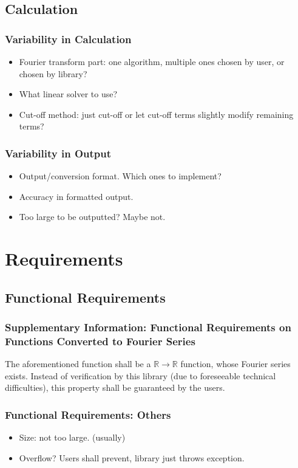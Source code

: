 \documentclass{beamer}
\begin{document}
		\subsection{Calculation}
		\begin{frame}
			\frametitle{Variability in Calculation}
			\begin{itemize}
				\item Fourier transform part: one algorithm, multiple ones chosen by user, or chosen by library?
				\item What linear solver to use?
				\item Cut-off method: just cut-off or let cut-off terms slightly modify remaining terms?
			\end{itemize}
		\end{frame}
	
		\begin{frame}
			\frametitle{Variability in Output}
			\begin{itemize}
				\item Output/conversion format. Which ones to implement?
				\item Accuracy in formatted output.
				\item Too large to be outputted? Maybe not.
			\end{itemize}
		\end{frame}
	
	\section{Requirements}
	\subsection{Functional Requirements}
	\begin{frame}
	\frametitle{Supplementary Information: Functional Requirements on Functions Converted to Fourier Series}
	The aforementioned function shall be a $\mathbb{R}\rightarrow\mathbb{R}$ function, whose Fourier series exists. Instead of verification by this library (due to foreseeable technical difficulties), this property shall be guaranteed by the users. 
	\end{frame}
	
	\begin{frame}
		\frametitle{Functional Requirements: Others}
		\begin{itemize}
			\item Size: not too large. (usually)
			\item Overflow? Users shall prevent, library just throws exception.
		\end{itemize}
	\end{frame}
	
\end{document}
